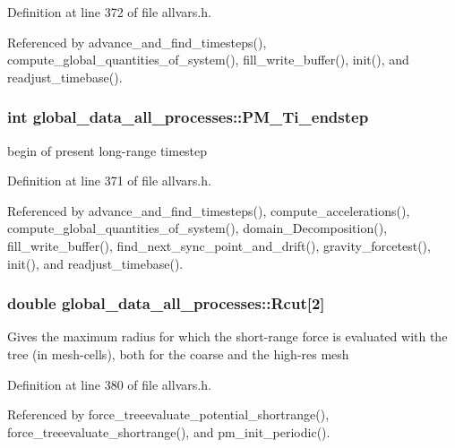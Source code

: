 Definition at line 372 of file allvars.h.



Referenced by advance\_\-and\_\-find\_\-timesteps(), compute\_\-global\_\-quantities\_\-of\_\-system(), fill\_\-write\_\-buffer(), init(), and readjust\_\-timebase().

\hypertarget{structglobal__data__all__processes_a723a0aa2f2ac0ac4cc58ebc049dda9b3}{
\subsubsection[{PM\_\-Ti\_\-endstep}]{\setlength{\rightskip}{0pt plus 5cm}int {\bf global\_\-data\_\-all\_\-processes::PM\_\-Ti\_\-endstep}}}
\label{structglobal__data__all__processes_a723a0aa2f2ac0ac4cc58ebc049dda9b3}
begin of present long-\/range timestep 

Definition at line 371 of file allvars.h.



Referenced by advance\_\-and\_\-find\_\-timesteps(), compute\_\-accelerations(), compute\_\-global\_\-quantities\_\-of\_\-system(), domain\_\-Decomposition(), fill\_\-write\_\-buffer(), find\_\-next\_\-sync\_\-point\_\-and\_\-drift(), gravity\_\-forcetest(), init(), and readjust\_\-timebase().

\hypertarget{structglobal__data__all__processes_aeb7ceb2f4d86465e1febbfad5fa849d6}{
\subsubsection[{Rcut}]{\setlength{\rightskip}{0pt plus 5cm}double {\bf global\_\-data\_\-all\_\-processes::Rcut}\mbox{[}2\mbox{]}}}
\label{structglobal__data__all__processes_aeb7ceb2f4d86465e1febbfad5fa849d6}
Gives the maximum radius for which the short-\/range force is evaluated with the tree (in mesh-\/cells), both for the coarse and the high-\/res mesh 

Definition at line 380 of file allvars.h.



Referenced by force\_\-treeevaluate\_\-potential\_\-shortrange(), force\_\-treeevaluate\_\-shortrange(), and pm\_\-init\_\-periodic().

